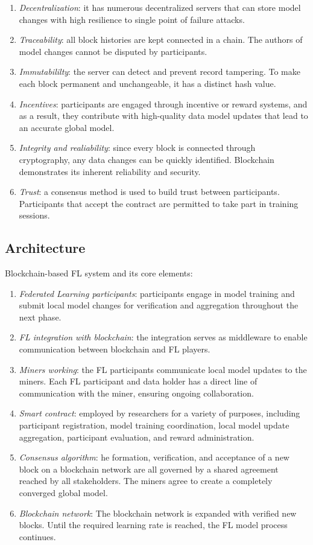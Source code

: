 \documentclass{article}
\begin{document}
\begin{enumerate}
\item \textit{Decentralization}: it has numerous decentralized servers that can store model changes with high resilience to single point of failure attacks.
\item \textit{Traceability}: all block histories are kept connected in a chain. The authors of model changes cannot be disputed by participants.
\item \textit{Immutabililty}: the server can detect and prevent record tampering. To make each block permanent and unchangeable, it has a distinct hash value.
\item \textit{Incentives}: participants are engaged through incentive or reward systems, and as a result, they contribute with high-quality data model updates that lead to an accurate global model.
\item \textit{Integrity and realiability}: since every block is connected through cryptography, any data changes can be quickly identified. Blockchain demonstrates its inherent reliability and security.
\item \textit{Trust}: a consensus method is used to build trust between participants. Participants that accept the contract are permitted to take part in training sessions.
\end{enumerate}

\subsection{Architecture}

Blockchain-based FL system and its core elements:

\begin{enumerate}
\item \textit{Federated Learning participants}: participants engage in model training and submit local model changes for verification and aggregation throughout the next phase.
\item \textit{FL integration with blockchain}: the integration serves as middleware to enable communication between blockchain and FL players.
\item \textit{Miners working}: the FL participants communicate local model updates to the miners. Each FL participant and data holder has a direct line of communication with the miner, ensuring ongoing collaboration.
\item \textit{Smart contract}: employed by researchers \citep{khan_2021} for a variety of purposes, including participant registration, model training coordination, local model update aggregation, participant evaluation, and reward administration.
\item \textit{Consensus algorithm}: he formation, verification, and acceptance of a new block on a blockchain network are all governed by a shared agreement reached by all stakeholders.
The miners agree to create a completely converged global model.
\item \textit{Blockchain network}: The blockchain network is expanded with verified new blocks. Until the required learning rate is reached, the FL model process continues.
\end{enumerate}
\end{document}
